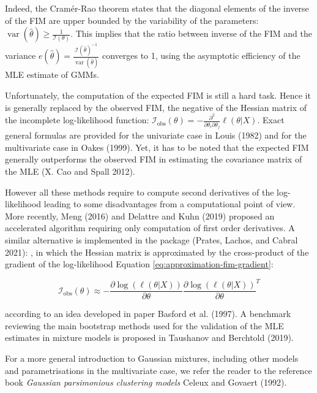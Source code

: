 Indeed, the Cramér-Rao theorem states that the diagonal elements of the
inverse of the FIM are upper bounded by the variability of the
parameters:
\(\operatorname{var}(\hat{\theta}) \ge \frac{1}{\mathcal{I}(\theta)}\). This
implies that the ratio between inverse of the FIM and the variance
\(e(\hat{\theta})=\frac{\mathcal{I}(\hat{\theta})^{-1}}{\operatorname{var}(\hat{\theta})}\)
converges to 1, using the asymptotic efficiency of the MLE estimate of
GMMs.

Unfortunately, the computation of the expected FIM is still a hard task.
Hence it is generally replaced by the observed FIM, the negative of the
Hessian matrix of the incomplete log-likelihood function:
\(\mathcal{I}_\text{obs}(\theta)= -\frac{\partial^2}{\partial \theta_i \partial \theta_j} \ell(\theta|X)\).
Exact general formulas are provided for the univariate case in Louis (1982)
and for the multivariate case in Oakes (1999). Yet, it has to be noted that
the expected FIM generally outperforms the observed FIM in estimating
the covariance matrix of the MLE (X. Cao and Spall 2012).

However all these methods require to compute second derivatives of the
log-likelihood leading to some disadvantages from a computational point
of view. More recently, Meng (2016) and Delattre and Kuhn (2019) proposed an
accelerated algorithm requiring only computation of first order
derivatives. A similar alternative is implemented in the
 package (Prates, Lachos, and Cabral 2021):
, in which the Hessian matrix is approximated by the cross-product of the
gradient of the log-likelihood Equation
\eqref{eq:approximation-fim-gradient}:

\begin{equation}
        \mathcal{I}_{\text{obs}}(\theta) \approx - \frac{\partial \log (\ell (\theta|X))}{\partial \theta} \frac{\partial \log (\ell (\theta|X))}{\partial \theta}^T
    \label{eq:approximation-fim-gradient}
\end{equation}

according to an idea developed in paper Basford et al. (1997). A benchmark
reviewing the main bootstrap methods used for the validation of the MLE
estimates in mixture models is proposed in Taushanov and Berchtold (2019).

For a more general introduction to Gaussian mixtures, including other
models and parametrisations in the multivariate case, we refer the
reader to the reference book \emph{Gaussian parsimonious clustering models}
Celeux and Govaert (1992).

